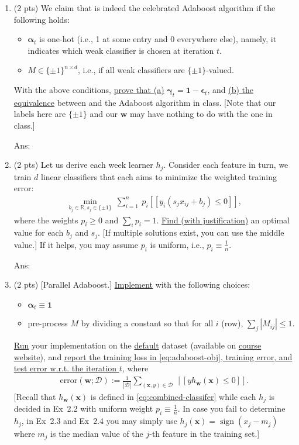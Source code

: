\documentclass[10pt]{article}
\newcommand{\wv}{\mathbf{w}}
\newcommand{\xv}{\mathbf{x}}
\newcommand{\Dc}{\mathcal{D}}
\newcommand{\RR}{\mathds{R}}
\newcommand{\alphav}{\boldsymbol{\alpha}}
\newcommand{\epsilonv}{\boldsymbol{\epsilon}}
\newcommand{\gammav}{\boldsymbol{\gamma}}
\newcommand{\ans}[1]{{\color{blue}\textsf{Ans}: #1}}
\newcommand{\one}{\mathbf{1}}
\newcommand{\pred}[1]{[\![#1]\!]}
\newcommand{\sign}{\mathop{\mathrm{sign}}}
\newcommand{\ie}{{i.e.}\xspace}
\newcommand{\green}[1]{{\color{green}#1}}
\begin{document}
\begin{exercise}
		\begin{enumerate}
		\item (2 pts) We claim that  is indeed the celebrated Adaboost algorithm if the following holds: 
		\begin{itemize}
		\item $\alphav_t$ is one-hot (i.e., 1 at some entry and 0 everywhere else), namely, it indicates which weak classifier is chosen at iteration $t$. 
		\item $M \in \{\pm1\}^{n\times d}$, \ie, if all weak classifiers are $\{\pm 1\}$-valued.
		\end{itemize}
		With the above conditions, \uline{prove that (a)} $\gammav_t = \one - \epsilonv_t$, and \uline{(b) the equivalence} between  and the Adaboost algorithm in class. [Note that our labels here are $\{\pm1\}$ and our $\wv$ may have nothing to do with the one in class.]
		
		\ans{%
			\vskip8cm
		}

		\item (2 pts) Let us derive each week learner $h_j$. Consider each feature in turn, we train $d$ linear classifiers that each aims to minimize the weighted training error: 
		\begin{align}
			\min_{b_j\in \RR, s_j \in \{\pm1\}} ~ \sum_{i=1}^n ~ p_i \pred{ y_i (s_j x_{ij} + b_j) \leq 0  },
		\end{align}
		where the weights $p_i \geq 0$ and $\sum_i p_i = 1$. 
		\uline{Find (with justification)} an optimal value for each $b_j$ and $s_j$. [If multiple solutions exist, you can use the middle value.] 
		If it helps, you may assume $p_i$ is uniform, i.e., $p_i \equiv \tfrac1n$.
		
		\ans{%
		\vskip8cm
		}
		
		\item (2 pts) [Parallel Adaboost.] \uline{Implement}  with the following choices: 
		\begin{itemize}
		\item $\alphav_t \equiv \one$
		\item pre-process $M$ by dividing a constant so that for all $i$ (row), $\sum_j |M_{ij}| \leq 1$.
		\end{itemize}
		\uline{Run} your implementation on the \href{https://archive.ics.uci.edu/dataset/350/default+of+credit+card+clients}{default} dataset (available on \href{https://cs.uwaterloo.ca/~y328yu/mycourses/480/assignment.html}{course website}), and \uline{report the training loss in \eqref{eq:adaboost-obj}, training error, and test error w.r.t. the iteration $t$,} where 
		\begin{align}
			\label{eq:error}
			\mathrm{error}(\wv; \Dc) := \frac{1}{|\Dc|}\sum_{ (\xv, y) \in \Dc} ~\pred{y h_{\wv}(\xv) \leq 0}.
		\end{align}
		[Recall that $h_\wv(\xv)$ is defined in \eqref{eq:combined-classifer} while each $h_j$ is decided in Ex~2.2 \green{with uniform weight $p_i \equiv \tfrac1n$}. In case you fail to determine $h_j$, in Ex~2.3 and Ex~2.4 you may simply use $h_j(\xv) = \sign(x_j-m_j)$ where $m_j$ is the median value of the $j$-th feature in the training set.]
		

\end{enumerate}
\end{exercise}
\end{document}
